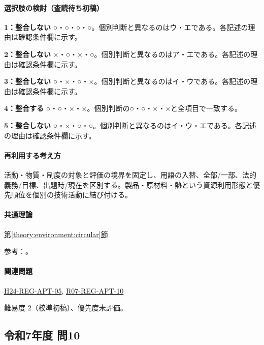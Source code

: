 \paragraph{選択肢の検討（査読待ち初稿）}\mbox{}\par

\noindent\textbf{1：整合しない} ○・○・○・○。個別判断と異なるのはウ・エである。各記述の理由は確認条件欄に示す。\par

\noindent\textbf{2：整合しない} ×・○・×・○。個別判断と異なるのはア・エである。各記述の理由は確認条件欄に示す。\par

\noindent\textbf{3：整合しない} ○・×・○・×。個別判断と異なるのはイ・ウである。各記述の理由は確認条件欄に示す。\par

\noindent\textbf{4：整合する} ○・○・×・×。個別判断の○・○・×・×と全項目で一致する。\par

\noindent\textbf{5：整合しない} ○・×・○・○。個別判断と異なるのはイ・ウ・エである。各記述の理由は確認条件欄に示す。\par

\paragraph{再利用する考え方} 活動・物質・制度の対象と評価の境界を固定し、用語の入替、全部/一部、法的義務/目標、出題時/現在を区別する。製品・原材料・熱という資源利用形態と優先順位を個別の技術活動に結び付ける。

\paragraph{共通理論} \hyperref[theory:environment:circular]{第\ref*{theory:environment:circular}節}

\par 参考：\cite{env_circular_law}。

\paragraph{関連問題} \hyperref[q:h24-reg-apt-05]{H24-REG-APT-05}, \hyperref[q:r07-reg-apt-10]{R07-REG-APT-10}

\par 難易度 2（校準初稿）、優先度未評価。

\subsection{令和7年度 問10}
\label{q:r07-reg-apt-10}

